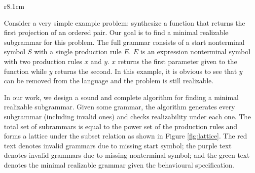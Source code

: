 \documentclass[acmsmall, nonacm]{acmart}
\begin{document}
 \begin{wrapfigure}{r}{8.1cm}   
\label{fig:lattice}
\end{wrapfigure}

Consider a very simple example problem: synthesize a function that returns the first projection of an ordered pair. Our goal is to find a minimal realizable subgrammar for this problem. The full grammar consists of a start nonterminal symbol $S$ with a single production rule $E$. $E$ is an expression nonterminal symbol with two production rules $x$ and $y$. $x$ returns the first parameter given to the function while $y$ returns the second. In this example, it is obvious to see that $y$ can be removed from the language and the problem is still realizable.

In our work, we design a sound and complete algorithm for finding a minimal realizable subgrammar. Given some grammar, the algorithm generates every subgrammar (including invalid ones) and checks realizability under each one. The total set of subrammars is equal to the power set of the production rules and forms a lattice under the subset relation as shown in Figure \ref{fig:lattice}. The red text denotes invalid grammars due to missing start symbol; the purple text denotes invalid grammars due to missing nonterminal symbol; and the green text denotes the minimal realizable grammar given the behavioural specification.
\end{document}

